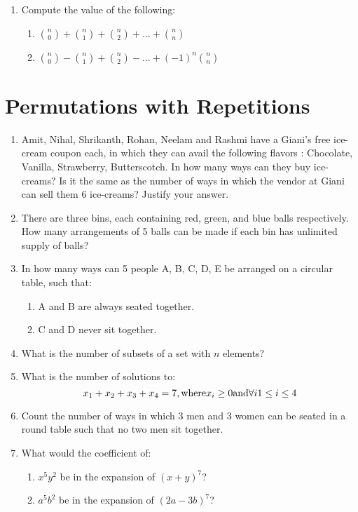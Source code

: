 \documentclass[a4paper]{article}
\begin{document}
\begin{enumerate}
\item Compute the value of the following:
\begin{enumerate}[label=(\alph*)]
\item ${n \choose 0} + {n \choose 1} + {n \choose 2} + \dots + {n \choose n}$ 
\item ${n \choose 0} - {n \choose 1} + {n \choose 2} - \dots + (-1)^n {n \choose n}$
\end{enumerate}
\end{enumerate}

\section{Permutations with Repetitions}
\begin{enumerate}
\item Amit, Nihal, Shrikanth, Rohan, Neelam and Rashmi have a Giani's free ice-cream coupon each, in which they can avail the following flavors : Chocolate, Vanilla, Strawberry, Butterscotch. In how many ways can they buy ice-creams? Is it the same as the number of ways in which the vendor at Giani can sell them 6 ice-creams? Justify your answer.

\item There are three bins, each containing red, green, and blue balls respectively. How many arrangements of 5 balls can be made if each bin has unlimited supply of balls?

\item In how many ways can 5 people A, B, C, D, E be arranged on a circular table, such that:
\begin{enumerate}[label=(\alph*)]
\item A and B are always seated together.
\item C and D never sit together.
\end{enumerate}

\item What is the number of subsets of a set with $n$ elements?

\item What is the number of solutions to:
\begin{equation}
x_1 + x_2 + x_3 + x_4 = 7 , \textnormal{where} x_i \geq 0 \textnormal{and} \forall i 1 \leq i \leq 4
\end{equation}

\item Count the number of ways in which 3 men and 3 women can be seated in a round table such that no two men sit together.

\item What would the coefficient of:
\begin{enumerate}[label=(\alph*)]
\item $x^5y^2$ be in the expansion of $(x+y)^7$?
\item $a^5b^2$ be in the expansion of $(2a-3b)^7$?
\end{enumerate}
\end{enumerate}
\end{document}
